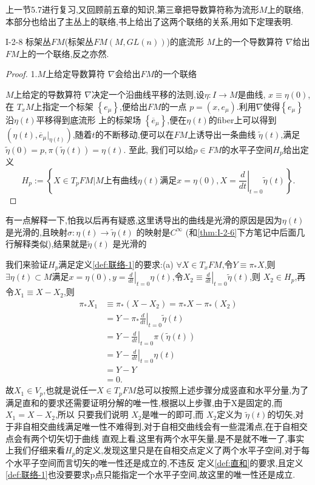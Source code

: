 \documentclass[../main.tex]{subfiles}
\begin{document}
上一节5.7进行复习,又回顾前五章的知识,第三章把导数算符称为流形$M$上的联络,本部分也给出了主丛上的联络,书上给出了这两个联络的关系,用如下定理表明.
 \begin{theorem}
   {}{I-2-8}
 标架丛$FM$(标架丛$FM(M,GL(n))$)的底流形 $M$上的一个导数算符 $\nabla $给出$FM$上的一个联络,反之亦然. 
\end{theorem}
\begin{proof}
  1.$M$上给定导数算符 $\nabla $会给出$FM$的一个联络

 $M$上给定的导数算符 $\nabla $决定一个沿曲线平移的法则,设$\eta: I \to M$是曲线, $x \equiv \eta(0)$,在 $T_xM$上指定一个标架 $\left\{ e_\mu \right\} $,便给出$FM$的一点 $p = (x,e_\mu)$.利用$\nabla $使得$\left\{ e_\mu \right\} $ 沿$\eta(t)$平移得到底流形
 上的标架场 $\left\{ \overline{e}_\mu \right\} $,便在$\eta(t)$的fiber上可以得到 $(\eta(t),\overline{e}_\mu|_{\eta(t)})$,随着$t$的不断移动,便可以在$FM$上诱导出一条曲线 $\tilde{\eta}(t)$,满足$\tilde{\eta}(0) = p, \pi(\tilde{\eta}(t)) = \eta(t)$.
至此, 我们可以给$p \in FM$的水平子空间$H_p$给出定义 \[
  H_p := \left\{ X \in T_pFM|M\text{上有曲线}\eta(t)\text{满足}x = \eta(0),X = \left.\frac{d}{dt} \right|_{t = 0} \tilde{\eta}(t) \right\}
.\] 
\end{proof}
\begin{note}
  有一点解释一下,怕我以后再有疑惑,这里诱导出的曲线是光滑的原因是因为$\eta(t)$是光滑的,且映射$\sigma:\eta(t) \to \tilde{\eta}(t)$ 的映射是$C^\infty$ (和\ref{thm:I-2-6}下方笔记中后面几行解释类似),结果就是$\tilde{\eta}(t)$ 是光滑的
\end{note}
我们来验证$H_p$满足定义\ref{def:联络-1}的要求:{\color{red}(a)} $\forall X \in T_xFM$,令$Y \equiv \pi_*X$,则 $\exists \eta(t) \subset M$满足$x = \eta(0), y = \left.\frac{d}{dt} \right|_{t = 0}\eta(t)$,令$X_2 \equiv \left. \frac{d}{dt} \right|_{t = 0}\tilde{\eta}(t)$,则
$X_2 \in H_p$,再令$X_1 \equiv X- X_2$,则
 \begin{align*}
   \pi_*X_1 &\equiv \pi_*(X-X_2) = \pi_* X - \pi_*(X_2)\\
            & = Y - \pi_* \left. \frac{d}{dt} \right|_{t = 0} \tilde{\eta}(t)\\
            & = Y -  \left. \frac{d}{dt} \right|_{t = 0} \pi(\tilde{\eta}(t))\\
            & = Y -  \left. \frac{d}{dt} \right|_{t = 0}\eta(t)\\
            & = Y - Y\\ 
            & = 0
.\end{align*}
故$X_1 \in V_p$,也就是说任一$X \in T_pFM$总可以按照上述步骤分成竖直和水平分量,为了满足直和的要求还需要证明分解的唯一性,根据以上步骤,由于X是固定的,而$X_1 = X -X_2$,所以
只要我们说明 $X_2$是唯一的即可,而 $X_2$定义为 $\tilde{\eta}(t)$的切矢,对于非自相交曲线满足唯一性不难得到,对于自相交曲线会有一些混淆点,在于自相交点会有两个切矢切于曲线
直观上看,这里有两个水平矢量,是不是就不唯一了,事实上我们仔细来看$H_p$的定义,发现这里只是在自相交点定义了两个水平子空间,对于每个水平子空间而言切矢的唯一性还是成立的,不违反
定义\ref{def:直和}的要求,且定义\ref{def:联络-1}也没要要求p点只能指定一个水平子空间,故这里的唯一性还是成立.
\end{document}
